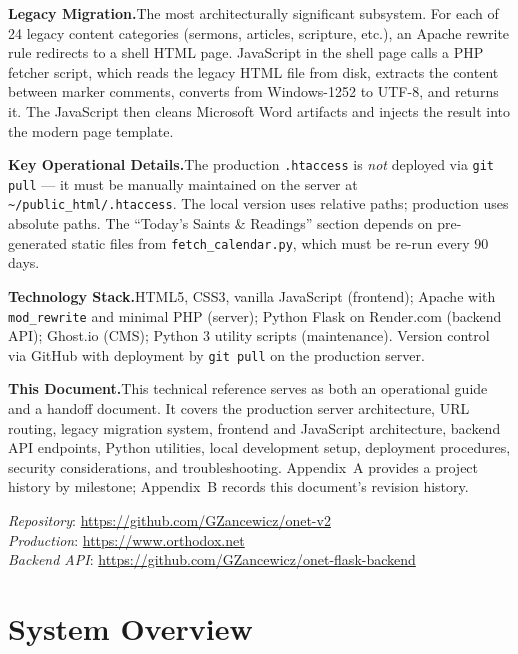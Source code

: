 \documentclass[12pt]{article}
\begin{document}
\medskip
\textbf{Legacy Migration.}\quad The most architecturally significant subsystem. For each of 24 legacy content categories (sermons, articles, scripture, etc.), an Apache rewrite rule redirects to a shell HTML page. JavaScript in the shell page calls a PHP fetcher script, which reads the legacy HTML file from disk, extracts the content between marker comments, converts from Windows-1252 to UTF-8, and returns it. The JavaScript then cleans Microsoft Word artifacts and injects the result into the modern page template.

\medskip
\textbf{Key Operational Details.}\quad The production \texttt{.htaccess} is \emph{not} deployed via \texttt{git pull} --- it must be manually maintained on the server at \texttt{\textasciitilde/public\_html/.htaccess}. The local version uses relative paths; production uses absolute paths. The ``Today's Saints \& Readings'' section depends on pre-generated static files from \texttt{fetch\_calendar.py}, which must be re-run every 90 days.

\medskip
\textbf{Technology Stack.}\quad HTML5, CSS3, vanilla JavaScript (frontend); Apache with \texttt{mod\_rewrite} and minimal PHP (server); Python Flask on Render.com (backend API); Ghost.io (CMS); Python 3 utility scripts (maintenance). Version control via GitHub with deployment by \texttt{git pull} on the production server.

\medskip
\textbf{This Document.}\quad This technical reference serves as both an operational guide and a handoff document. It covers the production server architecture, URL routing, legacy migration system, frontend and JavaScript architecture, backend API endpoints, Python utilities, local development setup, deployment procedures, security considerations, and troubleshooting. Appendix~A provides a project history by milestone; Appendix~B records this document's revision history.

\vfill
\begin{center}
\small\textit{Repository}: \url{https://github.com/GZancewicz/onet-v2}\\
\small\textit{Production}: \url{https://www.orthodox.net}\\
\small\textit{Backend API}: \url{https://github.com/GZancewicz/onet-flask-backend}
\end{center}

\newpage

\section{System Overview}
\end{document}
